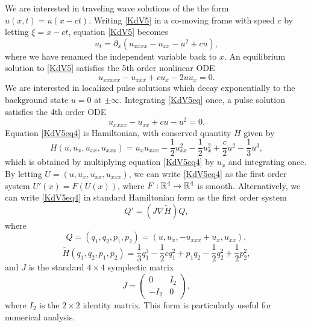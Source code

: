 \documentclass[10pt,reqno]{amsart}
\theoremstyle{plain}
\theoremstyle{definition}
\theoremstyle{remark}
\numberwithin{theorem}{section}
\numberwithin{equation}{section}
\begin{document}
We are interested in traveling wave solutions of the the form $u(x, t) = u(x - ct)$. Writing \cref{KdV5} in a co-moving frame with speed $c$ by letting $\xi = x - ct$, equation \cref{KdV5} becomes
\begin{equation}\label{KdV5c}
u_t = \partial_x(u_{xxxx} - u_{xx} - u^2 + cu) ,
\end{equation}
where we have renamed the independent variable back to $x$. An equilibrium solution to \cref{KdV5} satisfies the 5th order nonlinear ODE
\begin{equation}\label{KdV5eq}
u_{xxxxx} - u_{xxx} + c u_x - 2 u u_x = 0.
\end{equation}
We are interested in localized pulse solutions which decay exponentially to the background state $u = 0$ at $\pm \infty$. Integrating \cref{KdV5eq} once, a pulse solution satisfies the 4th order ODE
\begin{equation}\label{KdV5eq4}
u_{xxxx} - u_{xx} + c u - u^2 = 0.
\end{equation}
Equation \cref{KdV5eq4} is Hamiltonian, with conserved quantity $H$ given by
\begin{equation}\label{KdV5ham}
H(u, u_x, u_{xx}, u_{xxx}) = u_x u_{xxx} - \frac{1}{2}u_{xx}^2 - \frac{1}{2}u_x^2 + \frac{c}{2}u^2 - \frac{1}{3}u^3,
\end{equation}
which is obtained by multiplying equation \cref{KdV5eq4} by $u_x$ and integrating once. By letting $U = (u, u_x, u_{xx}, u_{xxx})$, we can write \cref{KdV5eq4} as the first order system $U'(x) = F(U(x))$, where $F: \mathbb{R}^4 \rightarrow \mathbb{R}^4$ is smooth. Alternatively, we can write \cref{KdV5eq4} in standard Hamiltonian form as the first order system
\begin{equation}\label{KdV5ham2}
Q' = (J \nabla \tilde{H}) Q,
\end{equation}
where 
\begin{equation}\label{KdV5Q}
Q = (q_1, q_2, p_1, p_2) = (u, u_x, -u_{xxx} + u_x, u_{xx}),
\end{equation}
\begin{equation}
\tilde{H}(q_1, q_2, p_1, p_2) = \frac{1}{3}q_1^3 - \frac{1}{2}c q_1^2 + p_1 q_2 - \frac{1}{2}q_2^2 + \frac{1}{2}p_2^2,
\end{equation}
and $J$ is the standard $4 \times 4$ symplectic matrix
\[
J = \begin{pmatrix}
0 & I_2 \\ -I_2 & 0
\end{pmatrix},
\]
where $I_2$ is the $2\times 2$ identity matrix. This form is particularly useful for numerical analysis.
\end{document}
